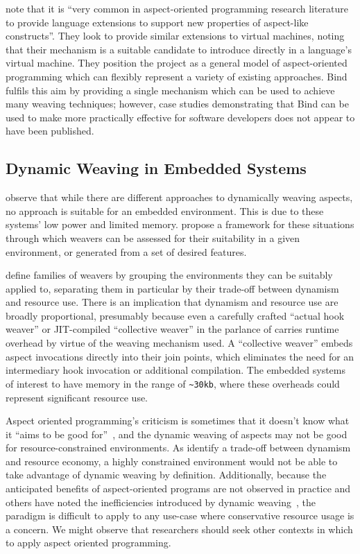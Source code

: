 \citeauthor{rajan2006nu_towardsao_invocation} note that it is ``very common in
aspect-oriented programming research literature to provide language extensions
to support new properties of aspect-like constructs''. They look to provide
similar extensions to virtual machines, noting that their mechanism is a
suitable candidate to introduce \aspectorientation{} directly in a language's
virtual machine. They position the project as a general model of aspect-oriented
programming which can flexibly represent a variety of existing approaches. Bind
fulfils this aim by providing a single mechanism which can be used to achieve
many weaving techniques; however, case studies demonstrating that Bind can be
used to make \aspectorientation{} more practically effective for software
developers does not appear to have been published.


\subsection{Dynamic Weaving in Embedded Systems}

\citet{gilani2004family} observe that while there are different approaches
to dynamically weaving aspects, no approach is suitable for an embedded
environment. This is due to these systems' low power and
limited memory. \citeauthor{gilani2004family} propose a framework for these
situations through which weavers can be assessed for their suitability in a
given environment, or generated from a set of desired features.

\citeauthor{gilani2004family} define families of weavers by grouping the
environments they can be suitably applied to, separating them in particular by
their trade-off between dynamism and resource use. There is an implication that
dynamism and resource use are broadly proportional, presumably because even a
carefully crafted ``actual hook weaver'' or JIT-compiled ``collective weaver''
in the parlance of \citet{dynamicAOchitchyan} carries runtime overhead by virtue
of the weaving mechanism used. A ``collective weaver'' embeds aspect invocations
directly into their join points, which eliminates the need for an intermediary
hook invocation or additional compilation. The embedded systems of interest to
\citeauthor{gilani2004family} have memory in the range of \lstinline{~30kb},
where these overheads could represent significant resource use.

Aspect oriented programming's criticism is sometimes that it doesn't know what
it ``aims to be good for''~\cite{steimann06paradoxical}, and the dynamic weaving
of aspects may not be good for resource-constrained environments. As
\citeauthor{gilani2004family} identify a trade-off between dynamism and resource
economy, a highly constrained environment would not be able to take advantage of
dynamic weaving by definition. Additionally, because the anticipated benefits of
aspect-oriented programs are not observed in practice and others have noted the
inefficiencies introduced by dynamic
weaving~\cite{dyerNUmasters,dynamicAOchitchyan}, the paradigm is difficult to
apply to any use-case where conservative resource usage is a concern. We might
observe that researchers should seek other contexts in which to apply aspect
oriented programming.

